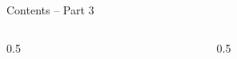 \documentclass[aspectratio=169,11pt]{beamer}
\subtitle{Part 3: Statistical Inference}
\begin{document}
\begin{frame}
  \titlepage
\end{frame}

\aboutlecturer

\courseoverview

\begin{frame}{Contents -- Part 3}
  \begin{columns}[T]
    \begin{column}{0.5\textwidth}
      \tableofcontents[hideallsubsections,sections={1-3}]
    \end{column}
    \begin{column}{0.5\textwidth}
      \tableofcontents[hideallsubsections,sections={4-6}]
    \end{column}
  \end{columns}
\end{frame}
\end{document}
